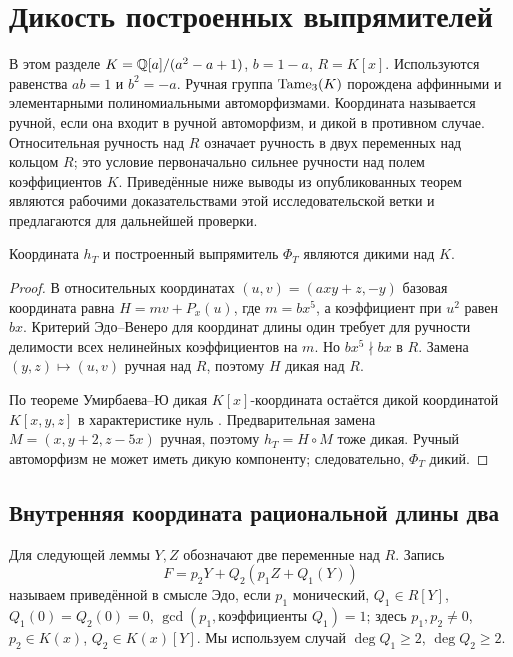 \section{Дикость построенных выпрямителей}\label{sec:group-results}

В этом разделе $K={\mathbb Q}[a]/(a^2-a+1)$, $b=1-a$, $R=K[x]$.
Используются равенства $ab=1$ и $b^2=-a$.
Ручная группа $\operatorname{Tame}_3(K)$ порождена аффинными и элементарными
полиномиальными автоморфизмами. Координата называется ручной, если она
входит в ручной автоморфизм, и дикой в противном случае.
Относительная ручность над $R$ означает ручность в двух переменных над
кольцом $R$; это условие первоначально сильнее ручности над полем
коэффициентов $K$. Приведённые ниже выводы из опубликованных теорем
являются рабочими доказательствами этой исследовательской ветки и
предлагаются для дальнейшей проверки.

\begin{proposition}\label{prop:trefoil-wild}
Координата $h_T$ и построенный выпрямитель $\Phi_T$ являются дикими
над $K$.
\end{proposition}
\begin{proof}
В относительных координатах $(u,v)=(axy+z,-y)$ базовая координата равна
$H=mv+P_x(u)$, где $m=bx^5$, а коэффициент при $u^2$ равен $bx$.
Критерий Эдо--Венеро для координат длины один
\cite[предложение~2]{EV2001} требует для ручности делимости всех
нелинейных коэффициентов на $m$. Но $bx^5\nmid bx$ в $R$.
Замена $(y,z)\mapsto(u,v)$ ручная над $R$, поэтому $H$ дикая над $R$.

По теореме Умирбаева--Ю дикая $K[x]$-координата остаётся дикой
координатой $K[x,y,z]$ в характеристике нуль
\cite[главная теорема]{UY2004}.
Предварительная замена $M=(x,y+2,z-5x)$ ручная, поэтому $h_T=H\circ M$
тоже дикая. Ручный автоморфизм не может иметь дикую компоненту;
следовательно, $\Phi_T$ дикий.
\end{proof}

\subsection{Внутренняя координата рациональной длины два}

Для следующей леммы $Y,Z$ обозначают две переменные над $R$.
Запись
\[
 F=p_2Y+Q_2(p_1Z+Q_1(Y))
\]
называем приведённой в смысле Эдо, если $p_1$ монический,
$Q_1\in R[Y]$, $Q_1(0)=Q_2(0)=0$,
$\gcd(p_1,\text{коэффициенты }Q_1)=1$;
здесь $p_1,p_2\ne0$, $p_2\in K(x)$, $Q_2\in K(x)[Y]$.
Мы используем случай $\deg Q_1\ge2$, $\deg Q_2\ge2$.

